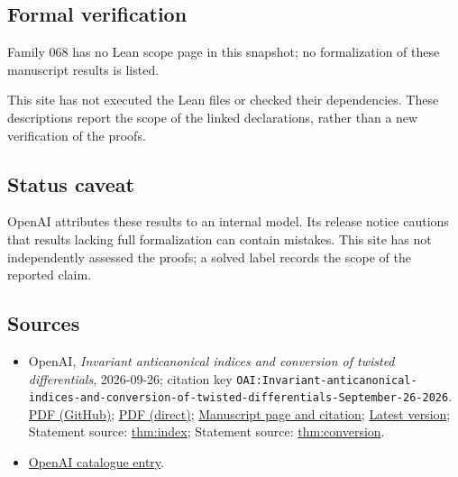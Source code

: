 \documentclass[11pt]{article}
\begin{document}
\subsection{Formal verification}
Family 068 has no Lean scope page in this snapshot; no formalization of these manuscript results is listed.

This site has not executed the Lean files or checked their dependencies. These descriptions report the scope of the linked declarations, rather than a new verification of the proofs.

\subsection{Status caveat}
OpenAI attributes these results to an internal model. Its release notice cautions that results lacking full formalization can contain mistakes. This site has not independently assessed the proofs; a solved label records the scope of the reported claim.

\subsection{Sources}
\begin{itemize}
\item OpenAI, \emph{Invariant anticanonical indices and conversion of twisted differentials}, 2026-09-26; citation key \texttt{OAI:Invariant-anticanonical-indices-and-conversion-of-twisted-differentials-September-26-2026}. \href{https://github.com/openai/math/blob/adc7f1241b42e322a6451854ab7e4b4c146bf78a/preprints/Invariant-anticanonical-indices-and-conversion-of-twisted-differentials-September-26-2026/main.pdf}{PDF (GitHub)}; \href{https://github.com/openai/math/raw/adc7f1241b42e322a6451854ab7e4b4c146bf78a/preprints/Invariant-anticanonical-indices-and-conversion-of-twisted-differentials-September-26-2026/main.pdf}{PDF (direct)}; \href{https://github.com/openai/math/blob/adc7f1241b42e322a6451854ab7e4b4c146bf78a/preprints/Invariant-anticanonical-indices-and-conversion-of-twisted-differentials-September-26-2026/README.md}{Manuscript page and citation}; \href{https://github.com/openai/math/blob/main/preprints/Invariant-anticanonical-indices-and-conversion-of-twisted-differentials-September-26-2026/main.pdf}{Latest version}; Statement source: \href{https://github.com/openai/math/blob/adc7f1241b42e322a6451854ab7e4b4c146bf78a/preprints/Invariant-anticanonical-indices-and-conversion-of-twisted-differentials-September-26-2026/build/source/sections/introduction.tex\#L29}{thm:index}; Statement source: \href{https://github.com/openai/math/blob/adc7f1241b42e322a6451854ab7e4b4c146bf78a/preprints/Invariant-anticanonical-indices-and-conversion-of-twisted-differentials-September-26-2026/build/source/sections/introduction.tex\#L98}{thm:conversion}.
\item \href{https://github.com/openai/math/blob/adc7f1241b42e322a6451854ab7e4b4c146bf78a/CONTENTS.md}{OpenAI catalogue entry}.
\end{itemize}
\end{document}
